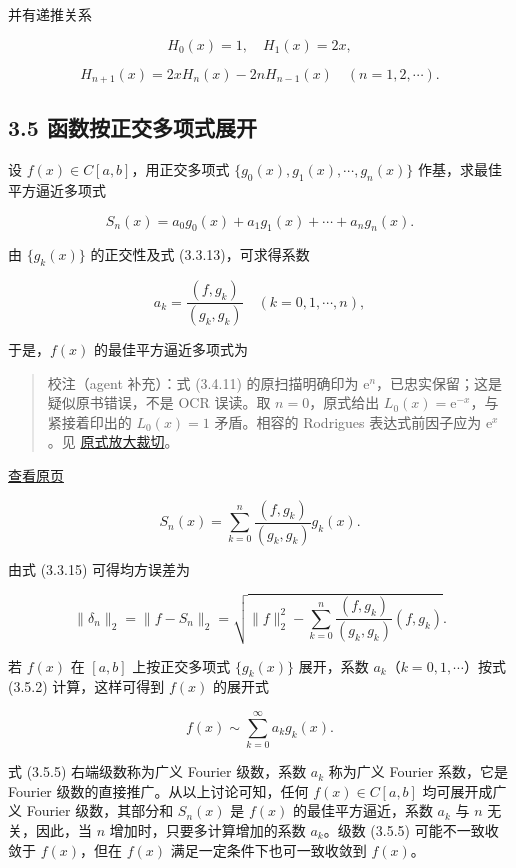 \documentclass[
  10pt,
  fontset=fandol]{ctexart}
\begin{document}
并有递推关系

\[
H_0(x)=1,\quad H_1(x)=2x,
\]

\[
H_{n+1}(x)=2xH_n(x)-2nH_{n-1}(x)\quad(n=1,2,\cdots).
\]

\subsection{3.5 函数按正交多项式展开}\label{ux51fdux6570ux6309ux6b63ux4ea4ux591aux9879ux5f0fux5c55ux5f00}

设 \(f(x)\in C[a,b]\)，用正交多项式 \(\{g_0(x),g_1(x),\cdots,g_n(x)\}\) 作基，求最佳平方逼近多项式

\[
S_n(x)=a_0g_0(x)+a_1g_1(x)+\cdots+a_ng_n(x).\tag{3.5.1}
\]

由 \(\{g_k(x)\}\) 的正交性及式 (3.3.13)，可求得系数

\[
a_k=\frac{(f,g_k)}{(g_k,g_k)}\quad(k=0,1,\cdots,n),\tag{3.5.2}
\]

于是，\(f(x)\) 的最佳平方逼近多项式为

\begin{quote}
校注（agent 补充）：式 (3.4.11) 的原扫描明确印为 \(\mathrm e^n\)，已忠实保留；这是疑似原书错误，不是 OCR 误读。取 \(n=0\)，原式给出 \(L_0(x)=\mathrm e^{-x}\)，与紧接着印出的 \(L_0(x)=1\) 矛盾。相容的 Rodrigues 表达式前因子应为 \(\mathrm e^x\)。见 \href{../assets/ch03b/p076-laguerre-formula.png}{原式放大裁切}。
\end{quote}

\href{../../source-images/pdf-077.jpeg}{查看原页}

\[
S_n(x)=\sum_{k=0}^n\frac{(f,g_k)}{(g_k,g_k)}g_k(x).\tag{3.5.3}
\]

由式 (3.3.15) 可得均方误差为

\[
\|\delta_n\|_2=\|f-S_n\|_2=\sqrt{\|f\|_2^2-\sum_{k=0}^n\frac{(f,g_k)}{(g_k,g_k)}(f,g_k)}.\tag{3.5.4}
\]

若 \(f(x)\) 在 \([a,b]\) 上按正交多项式 \(\{g_k(x)\}\) 展开，系数 \(a_k\)（\(k=0,1,\cdots\)）按式 (3.5.2) 计算，这样可得到 \(f(x)\) 的展开式

\[
f(x)\sim\sum_{k=0}^\infty a_kg_k(x).\tag{3.5.5}
\]

式 (3.5.5) 右端级数称为广义 Fourier 级数，系数 \(a_k\) 称为广义 Fourier 系数，它是 Fourier 级数的直接推广。从以上讨论可知，任何 \(f(x)\in C[a,b]\) 均可展开成广义 Fourier 级数，其部分和 \(S_n(x)\) 是 \(f(x)\) 的最佳平方逼近，系数 \(a_k\) 与 \(n\) 无关，因此，当 \(n\) 增加时，只要多计算增加的系数 \(a_k\)。级数 (3.5.5) 可能不一致收敛于 \(f(x)\)，但在 \(f(x)\) 满足一定条件下也可一致收敛到 \(f(x)\)。
\end{document}
